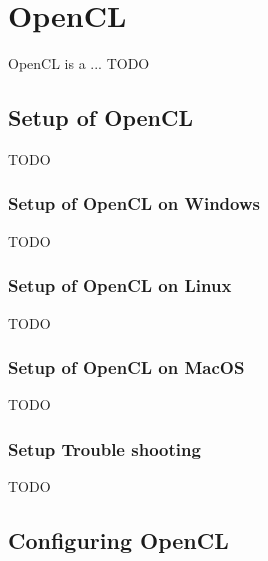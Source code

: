 \section{OpenCL}\label{opencl}

OpenCL is a ... TODO

\subsection{Setup of OpenCL}\label{setup-opencl}
TODO

\subsubsection{Setup of OpenCL on Windows}\label{setup-opencl-windows}
TODO

\subsubsection{Setup of OpenCL on Linux}\label{setup-opencl-linux}
TODO

\subsubsection{Setup of OpenCL on MacOS}\label{setup-opencl-macos}
TODO

\subsubsection{Setup Trouble shooting}\label{setup-opencl-troubleshooting}
TODO

\subsection{Configuring OpenCL}\label{configure-opencl}
